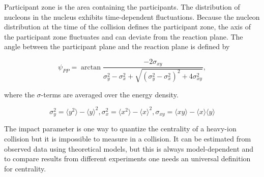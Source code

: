 Participant zone is the area containing the participants. The distribution of nucleons in the nucleus exhibits time-dependent fluctuations. Because the nucleon distribution at the time of the collision defines the participant zone, the axis of the participant zone fluctuates and can deviate from the reaction plane. The angle between the participant plane and the reaction plane is defined by ~\cite{Holopainen:2010gz}

\begin{equation}
\psi_{PP}=\arctan \frac{-2\sigma_{xy}}{\sigma_y^2-\sigma_x^2+\sqrt{\left(\sigma_y^2-\sigma_x^2\right)^2+4\sigma_{xy}^2}},
\label{eq:partangle}
\end{equation}

\noindent where the $\sigma$-terms are averaged over the energy density.

\begin{equation}
\sigma_y^2=\langle y^2\rangle-\langle y \rangle ^2, \sigma_x^2=\langle x^2\rangle-\langle x \rangle ^2, \sigma_{xy}=\langle xy \rangle - \langle x \rangle \langle y \rangle
\end{equation}

The impact parameter is one way to quantize the centrality of a heavy-ion collision but it is impossible to measure in a collision. It can be estimated from observed data using theoretical models, but this is always model-dependent and to compare results from different experiments one needs an universal definition for centrality. %





